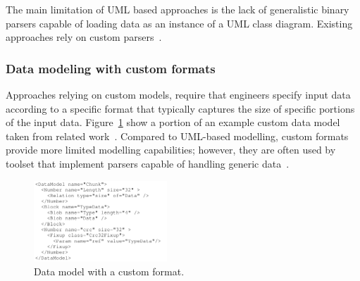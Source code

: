 The main limitation of UML based approaches is the lack of generalistic binary parsers capable of loading data as an instance of a UML class diagram. Existing approaches rely on custom parsers~\cite{di2015generating,di2015evolutionary}.

\subsubsection{Data modeling with custom formats}

Approaches relying on custom models, require that engineers specify input data according to a specific format that typically captures the size of specific portions of the input data. Figure~\ref{fig:pit} show a portion of an example custom data model taken from related work~\cite{pham2016model}.
Compared to UML-based modelling, custom formats provide more limited modelling capabilities; however, they are often used by toolset that implement parsers capable of handling generic data~\cite{PeachFuzzer}.


\begin{figure}[t!]
  \centering
    \includegraphics[width=5cm]{images/PeachPit}
      \caption{Data model with a custom format.}
      \label{fig:pit}
\end{figure}
